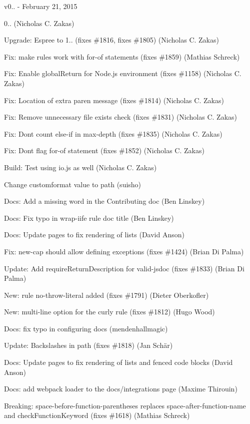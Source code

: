 v0.. -\/ February 21, 2015


\begin{DoxyItemize}
\item 0.. (Nicholas C. Zakas)
\item Upgrade\+: Espree to 1.. (fixes \#1816, fixes \#1805) (Nicholas C. Zakas)
\item Fix\+: make rules work with for-\/of statements (fixes \#1859) (Mathias Schreck)
\item Fix\+: Enable global\+Return for Node.\+js environment (fixes \#1158) (Nicholas C. Zakas)
\item Fix\+: Location of extra paren message (fixes \#1814) (Nicholas C. Zakas)
\item Fix\+: Remove unnecessary file exists check (fixes \#1831) (Nicholas C. Zakas)
\item Fix\+: Don\textquotesingle{}t count else-\/if in max-\/depth (fixes \#1835) (Nicholas C. Zakas)
\item Fix\+: Don\textquotesingle{}t flag for-\/of statement (fixes \#1852) (Nicholas C. Zakas)
\item Build\+: Test using io.\+js as well (Nicholas C. Zakas)
\item Change customformat value to path (suisho)
\item Docs\+: Add a missing word in the Contributing doc (Ben Linskey)
\item Docs\+: Fix typo in wrap-\/iife rule doc title (Ben Linskey)
\item Docs\+: Update pages to fix rendering of lists (David Anson)
\item Fix\+: new-\/cap should allow defining exceptions (fixes \#1424) (Brian Di Palma)
\item Update\+: Add require\+Return\+Description for valid-\/jsdoc (fixes \#1833) (Brian Di Palma)
\item New\+: rule no-\/throw-\/literal added (fixes \#1791) (Dieter Oberkofler)
\item New\+: multi-\/line option for the curly rule (fixes \#1812) (Hugo Wood)
\item Docs\+: fix typo in configuring docs (mendenhallmagic)
\item Update\+: Backslashes in path (fixes \#1818) (Jan Schär)
\item Docs\+: Update pages to fix rendering of lists and fenced code blocks (David Anson)
\item Docs\+: add webpack loader to the docs/integrations page (Maxime Thirouin)
\item Breaking\+: space-\/before-\/function-\/parentheses replaces space-\/after-\/function-\/name and check\+Function\+Keyword (fixes \#1618) (Mathias Schreck)
\end{DoxyItemize}

